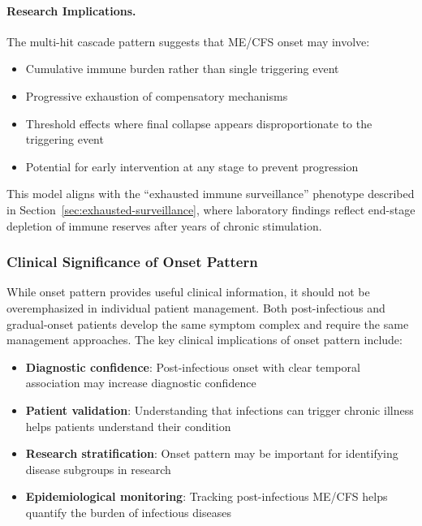 \paragraph{Research Implications.}
The multi-hit cascade pattern suggests that ME/CFS onset may involve:
\begin{itemize}
    \item Cumulative immune burden rather than single triggering event
    \item Progressive exhaustion of compensatory mechanisms
    \item Threshold effects where final collapse appears disproportionate to the triggering event
    \item Potential for early intervention at any stage to prevent progression
\end{itemize}

This model aligns with the ``exhausted immune surveillance'' phenotype described in Section~\ref{sec:exhausted-surveillance}, where laboratory findings reflect end-stage depletion of immune reserves after years of chronic stimulation.

\subsubsection{Clinical Significance of Onset Pattern}

While onset pattern provides useful clinical information, it should not be overemphasized in individual patient management. Both post-infectious and gradual-onset patients develop the same symptom complex and require the same management approaches. The key clinical implications of onset pattern include:

\begin{itemize}
    \item \textbf{Diagnostic confidence}: Post-infectious onset with clear temporal association may increase diagnostic confidence
    \item \textbf{Patient validation}: Understanding that infections can trigger chronic illness helps patients understand their condition
    \item \textbf{Research stratification}: Onset pattern may be important for identifying disease subgroups in research
    \item \textbf{Epidemiological monitoring}: Tracking post-infectious ME/CFS helps quantify the burden of infectious diseases
\end{itemize}

